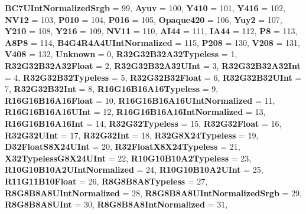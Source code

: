 \begin{DoxyCompactItemize}
{\bfseries B\+C7\+U\+Int\+Normalized\+Srgb} = 99, 
{\bfseries Ayuv} = 100, 
{\bfseries Y410} = 101, 
\newline
{\bfseries Y416} = 102, 
{\bfseries N\+V12} = 103, 
{\bfseries P010} = 104, 
{\bfseries P016} = 105, 
\newline
{\bfseries Opaque420} = 106, 
{\bfseries Yuy2} = 107, 
{\bfseries Y210} = 108, 
{\bfseries Y216} = 109, 
\newline
{\bfseries N\+V11} = 110, 
{\bfseries A\+I44} = 111, 
{\bfseries I\+A44} = 112, 
{\bfseries P8} = 113, 
\newline
{\bfseries A8\+P8} = 114, 
{\bfseries B4\+G4\+R4\+A4\+U\+Int\+Normalized} = 115, 
{\bfseries P208} = 130, 
{\bfseries V208} = 131, 
\newline
{\bfseries V408} = 132, 
{\bfseries Unknown} = 0, 
{\bfseries R32\+G32\+B32\+A32\+Typeless} = 1, 
{\bfseries R32\+G32\+B32\+A32\+Float} = 2, 
\newline
{\bfseries R32\+G32\+B32\+A32\+U\+Int} = 3, 
{\bfseries R32\+G32\+B32\+A32\+Int} = 4, 
{\bfseries R32\+G32\+B32\+Typeless} = 5, 
{\bfseries R32\+G32\+B32\+Float} = 6, 
\newline
{\bfseries R32\+G32\+B32\+U\+Int} = 7, 
{\bfseries R32\+G32\+B32\+Int} = 8, 
{\bfseries R16\+G16\+B16\+A16\+Typeless} = 9, 
{\bfseries R16\+G16\+B16\+A16\+Float} = 10, 
\newline
{\bfseries R16\+G16\+B16\+A16\+U\+Int\+Normalized} = 11, 
{\bfseries R16\+G16\+B16\+A16\+U\+Int} = 12, 
{\bfseries R16\+G16\+B16\+A16\+Int\+Normalized} = 13, 
{\bfseries R16\+G16\+B16\+A16\+Int} = 14, 
\newline
{\bfseries R32\+G32\+Typeless} = 15, 
{\bfseries R32\+G32\+Float} = 16, 
{\bfseries R32\+G32\+U\+Int} = 17, 
{\bfseries R32\+G32\+Int} = 18, 
\newline
{\bfseries R32\+G8\+X24\+Typeless} = 19, 
{\bfseries D32\+Float\+S8\+X24\+U\+Int} = 20, 
{\bfseries R32\+Float\+X8\+X24\+Typeless} = 21, 
{\bfseries X32\+Typeless\+G8\+X24\+U\+Int} = 22, 
\newline
{\bfseries R10\+G10\+B10\+A2\+Typeless} = 23, 
{\bfseries R10\+G10\+B10\+A2\+U\+Int\+Normalized} = 24, 
{\bfseries R10\+G10\+B10\+A2\+U\+Int} = 25, 
{\bfseries R11\+G11\+B10\+Float} = 26, 
\newline
{\bfseries R8\+G8\+B8\+A8\+Typeless} = 27, 
{\bfseries R8\+G8\+B8\+A8\+U\+Int\+Normalized} = 28, 
{\bfseries R8\+G8\+B8\+A8\+U\+Int\+Normalized\+Srgb} = 29, 
{\bfseries R8\+G8\+B8\+A8\+U\+Int} = 30, 
\newline
{\bfseries R8\+G8\+B8\+A8\+Int\+Normalized} = 31, 

\end{DoxyCompactItemize}
